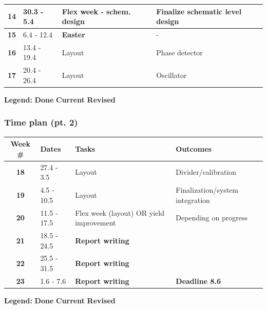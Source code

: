 \documentclass[t, screen, aspectratio=43]{beamer}
\begin{document}
\begin{frame}
\begin{table}[htb!]
\begin{tabular}{|c|l|l|l|}
			\rule[-1ex]{0pt}{2.5ex}\textbf{14}& 30.3 - 5.4 &  Flex week - schem. design & Finalize schematic level design\\ 
			\hline 
			\rule[-1ex]{0pt}{2.5ex}\textbf{15}& 6.4 - 12.4& {\color{red}\textbf{Easter}} & - \\ 
			\hline 
			\rule[-1ex]{0pt}{2.5ex}\textbf{16}& 13.4 - 19.4& Layout & Phase detector\\ 
			\hline 
			\rule[-1ex]{0pt}{2.5ex}\textbf{17}& 20.4 - 26.4& Layout & Oscillator\\ 
			\hline 
		\end{tabular}
		\begin{flushleft}\textbf{Legend:} \colorbox{red!20}{\textbf{Done}} \colorbox{green!20}{\textbf{Current}}  \colorbox{blue!20}{\textbf{Revised}}
		\end{flushleft}
	\end{table}   
\end{frame}

\begin{frame}
	\frametitle{Time plan (pt. 2)}
	\begin{table}[htb!]
		\tiny
		\centering
		\vspace{-1em}
		\def\arraystretch{1.5}		
		\setlength\arrayrulewidth{0.75pt}
		\setlength{\tabcolsep}{1em} %
		\begin{tabular}{|c|l|l|l|}
			\hline 
			\rule[-1ex]{0pt}{2.5ex}\cellcolor{gray!40}\textbf{Week \#} & \cellcolor{gray!40}\textbf{Dates} &\cellcolor{gray!40}\textbf{Tasks} & \cellcolor{gray!40}\textbf{Outcomes}\\ 
			\hline 
			\rule[-1ex]{0pt}{2.5ex}\textbf{18}& 27.4 - 3.5 & Layout & Divider/calibration\\ 
			\hline 
			\rule[-1ex]{0pt}{2.5ex}\textbf{19}& 4.5 - 10.5 & Layout & Finalization/system integration\\ 
			\hline 
			\rule[-1ex]{0pt}{2.5ex}\textbf{20}& 11.5 - 17.5 & Flex week (layout) OR yield improvement & Depending on progress\\ 
			\hline 
			\rule[-1ex]{0pt}{2.5ex}\textbf{21}& 18.5 - 24.5& {\color{blue}\textbf{Report writing}} & \\ 
			\hline 
			\rule[-1ex]{0pt}{2.5ex}\textbf{22}& 25.5 - 31.5& {\color{blue}\textbf{Report writing}} & \\ 
			\hline 
			\rule[-1ex]{0pt}{2.5ex}\textbf{23}& 1.6 - 7.6& {\color{blue}\textbf{Report writing}} & {\color{red}\textbf{Deadline 8.6}}\\ 
			\hline 
		\end{tabular}
		\begin{flushleft}\textbf{Legend:} \colorbox{red!20}{\textbf{Done}} \colorbox{green!20}{\textbf{Current}}  \colorbox{blue!20}{\textbf{Revised}}
		\end{flushleft}
	\end{table}   
\end{frame}
\end{document}

